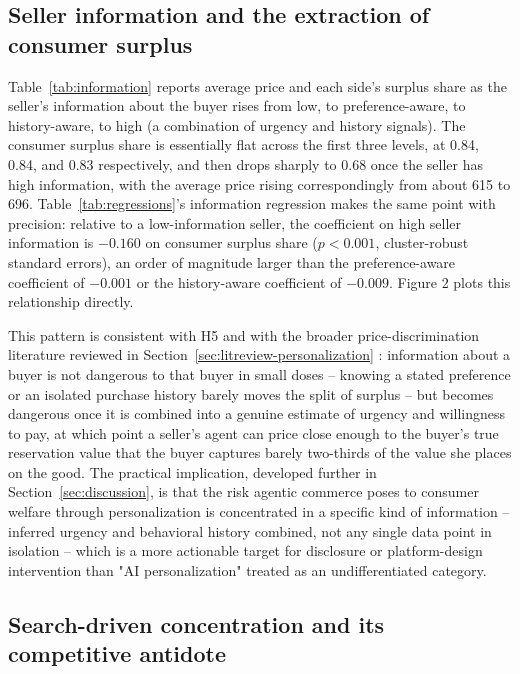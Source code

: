 \documentclass[review]{elsarticle}
\begin{document}
\FloatBarrier
\subsection{Seller information and the extraction of consumer surplus}
\label{sec:results-info}

Table~\ref{tab:information} reports average price and each side's surplus share as the seller's information about the buyer rises from low, to preference-aware, to history-aware, to high (a combination of urgency and history signals). The consumer surplus share is essentially flat across the first three levels, at 0.84, 0.84, and 0.83 respectively, and then drops sharply to 0.68 once the seller has high information, with the average price rising correspondingly from about 615 to 696. Table~\ref{tab:regressions}'s information regression makes the same point with precision: relative to a low-information seller, the coefficient on high seller information is $-0.160$ on consumer surplus share ($p<0.001$, cluster-robust standard errors), an order of magnitude larger than the preference-aware coefficient of $-0.001$ or the history-aware coefficient of $-0.009$. Figure 2 plots this relationship directly.

This pattern is consistent with H5 and with the broader price-discrimination literature reviewed in Section~\ref{sec:litreview-personalization} \citep{bergemann2015limits,acquisti2005conditioning}: information about a buyer is not dangerous to that buyer in small doses -- knowing a stated preference or an isolated purchase history barely moves the split of surplus -- but becomes dangerous once it is combined into a genuine estimate of urgency and willingness to pay, at which point a seller's agent can price close enough to the buyer's true reservation value that the buyer captures barely two-thirds of the value she places on the good. The practical implication, developed further in Section~\ref{sec:discussion}, is that the risk agentic commerce poses to consumer welfare through personalization is concentrated in a specific kind of information -- inferred urgency and behavioral history combined, not any single data point in isolation -- which is a more actionable target for disclosure or platform-design intervention than "AI personalization" treated as an undifferentiated category.

\FloatBarrier
\subsection{Search-driven concentration and its competitive antidote}
\label{sec:concentration}
\end{document}
